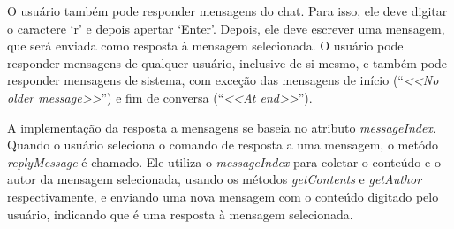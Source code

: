 \documentclass[../main.tex]{subfiles}
\begin{document}
O usuário também pode responder mensagens do chat.
Para isso, ele deve digitar o caractere `r' e depois apertar `Enter'.
Depois, ele deve escrever uma mensagem, que será enviada como resposta à mensagem selecionada.
O usuário pode responder mensagens de qualquer usuário, inclusive de si mesmo, e também pode responder mensagens de sistema, com exceção das mensagens de início (``\textit{<<No older message>>}'') e fim de conversa (``\textit{<<At end>>}'').

A implementação da resposta a mensagens se baseia no atributo \textit{messageIndex}.
Quando o usuário seleciona o comando de resposta a uma mensagem, o metódo \textit{replyMessage} é chamado.
Ele utiliza o \textit{messageIndex} para coletar o conteúdo e o autor da mensagem selecionada, usando os métodos \textit{getContents} e \textit{getAuthor} respectivamente, e enviando uma nova mensagem com o conteúdo digitado pelo usuário, indicando que é uma resposta à mensagem selecionada.
\end{document}
